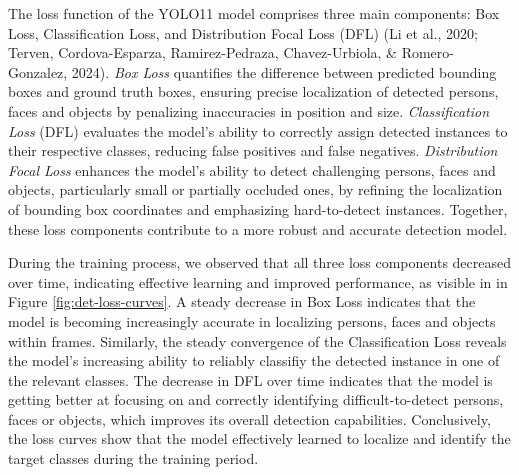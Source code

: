 \documentclass[
  man,floatsintext]{apa6}
\begin{document}
The loss function of the YOLO11 model comprises three main components: Box Loss, Classification Loss, and Distribution Focal Loss (DFL) (Li et al., 2020; Terven, Cordova-Esparza, Ramirez-Pedraza, Chavez-Urbiola, \& Romero-Gonzalez, 2024). \emph{Box Loss} quantifies the difference between predicted bounding boxes and ground truth boxes, ensuring precise localization of detected persons, faces and objects by penalizing inaccuracies in position and size. \emph{Classification Loss} (DFL) evaluates the model's ability to correctly assign detected instances to their respective classes, reducing false positives and false negatives. \emph{Distribution Focal Loss} enhances the model's ability to detect challenging persons, faces and objects, particularly small or partially occluded ones, by refining the localization of bounding box coordinates and emphasizing hard-to-detect instances. Together, these loss components contribute to a more robust and accurate detection model.

During the training process, we observed that all three loss components decreased over time, indicating effective learning and improved performance, as visible in in Figure \ref{fig:det-loss-curves}. A steady decrease in Box Loss indicates that the model is becoming increasingly accurate in localizing persons, faces and objects within frames. Similarly, the steady convergence of the Classification Loss reveals the model's increasing ability to reliably classifiy the detected instance in one of the relevant classes. The decrease in DFL over time indicates that the model is getting better at focusing on and correctly identifying difficult-to-detect persons, faces or objects, which improves its overall detection capabilities. Conclusively, the loss curves show that the model effectively learned to localize and identify the target classes during the training period.
\end{document}
